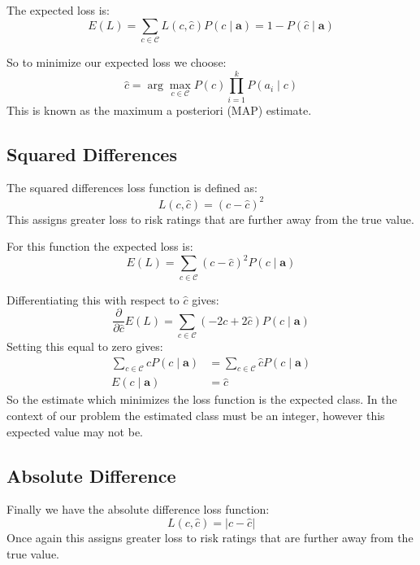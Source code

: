 The expected loss is:
\begin{equation}
	E(L) = \sum_{c \in \mathcal{C}} L(c, \hat{c})P(c \mid \mathbf{a}) = 1 - P(\hat{c} \mid \mathbf{a})
\end{equation}

So to minimize our expected loss we choose:
\begin{equation}\label{map}
	\hat c = \arg\max_{c \in \mathcal{C}} P(c)\prod_{i=1}^{k}P(a_i \mid c)
\end{equation}
This is known as the maximum a posteriori (MAP) estimate.

\subsection{Squared Differences}
The squared differences loss function is defined as:
\begin{equation}
	L(c, \hat{c}) = (c - \hat{c})^2
\end{equation}
This assigns greater loss to risk ratings that are further away from the true value.

For this function the expected loss is:
\begin{equation}
	E(L) = \sum_{c \in \mathcal{C}} (c - \hat{c})^2P(c \mid \mathbf{a}) 
\end{equation}

Differentiating this with respect to $\hat{c}$ gives:
\begin{equation}
	\frac{\partial}{\partial \hat{c}} E(L) = \sum_{c \in \mathcal{C}} (-2c + 2\hat{c})P(c \mid \mathbf{a}) 
\end{equation}
Setting this equal to zero gives:
\begin{align}
	\sum_{c \in \mathcal{C}} cP(c \mid \mathbf{a}) & = \sum_{c \in \mathcal{C}} \hat{c}P(c \mid \mathbf{a}) \\
	E(c \mid \mathbf{a}) & = \hat{c}
\end{align}
So the estimate which minimizes the loss function is the expected class.
In the context of our problem the estimated class must be an integer, however this expected value may not be.

\subsection{Absolute Difference}
Finally we have the absolute difference loss function:
\begin{equation}
	L(c, \hat{c}) = | c - \hat{c} |
\end{equation}
Once again this assigns greater loss to risk ratings that are further away from the true value.

